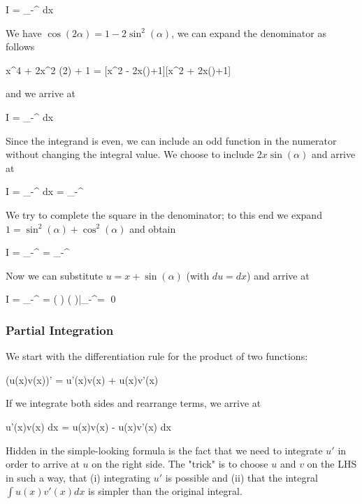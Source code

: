 \bee
I =  \int_{-\infty}^\infty {} dx
\eee

We have $\cos(2\alpha) = 1 - 2 \sin^2(\alpha)$, we can expand the denominator as follows

\bee
x^4 + 2x^2 \cos(2\alpha) + 1 = [x^2 - 2x\sin(\alpha)+1][x^2 + 2x\sin(\alpha)+1]
\eee

and we arrive at

\bee
I =  \int_{-\infty}^\infty {} dx
\eee

Since the integrand is even, we can include an odd function in the numerator without changing the integral value. We choose to include $2x\sin(\alpha)$ and arrive at

\bee
I =  \int_{-\infty}^\infty {} dx =  \int_{-\infty}^\infty {}
\eee

We try to complete the square in the denominator; to this end we expand $1 = \sin^2 (\alpha) + \cos^2(\alpha)$ and obtain

\bee
I =  \int_{-\infty}^\infty {} =  \int_{-\infty}^\infty {}
\eee

Now we can substitute $u = x+\sin(\alpha)$ (with $du = dx$) and arrive at

\bee
I =  \int_{-\infty}^\infty {} =  \left(  \right) \arctan\left(  \right)\bigg|_{-\infty}^\infty = \frac{\pi}{4 \cos(\alpha)} \qed
\eee


\subsubsection{Partial Integration}

We start with the differentiation rule for the product of two functions:

\bee
\left(u(x)v(x)\right)' = u'(x)v(x) + u(x)v'(x)
\eee

If we integrate both sides and rearrange terms, we arrive at

\be
\label{2018-03-26:eq2}
\int u'(x)v(x) dx  = u(x)v(x) - \int u(x)v'(x) dx
\ee

Hidden in the simple-looking formula is the fact that we need to integrate $u'$ in order to arrive at $u$ on the right side. The "trick" is to choose $u$ and $v$ on the LHS in such a way, that (i) integrating $u'$ is possible and (ii) that the integral $\int u(x)v'(x) dx$ is simpler than the original integral.

